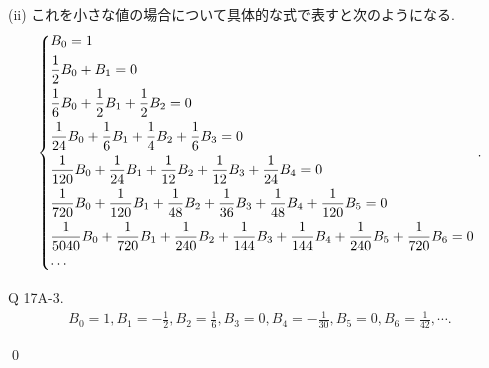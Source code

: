 \documentclass[uplatex,dvipdfmx,a4paper,11pt]{jlreq}
\makeatletter
\theoremstyle{definition}
\renewenvironment{proof}[1][\proofname]{\par
  \normalfont
  \topsep6\p@\@plus6\p@ \trivlist
  \item[\hskip\labelsep{\bfseries #1}\@addpunct{\bfseries}]\ignorespaces\quad\par
}{%
  \qed\endtrivlist\@endpefalse
}
\renewcommand\proofname{証明}
\makeatother
\begin{document}
\begin{proof}
  (ii)
  これを小さな値の場合について具体的な式で表すと次のようになる.
  \begin{align}
    \begin{dcases}
      B_0 = 1                                                                                                                                 \\
      \frac{1}{2}B_0 + B_1 = 0                                                                                                                \\
      \frac{1}{6}B_0 + \frac{1}{2}B_1 + \frac{1}{2}B_2 = 0                                                                                    \\
      \frac{1}{24}B_0 + \frac{1}{6}B_1 + \frac{1}{4}B_2 + \frac{1}{6}B_3 = 0                                                                  \\
      \frac{1}{120}B_0 + \frac{1}{24}B_1 + \frac{1}{12}B_2 + \frac{1}{12}B_3 + \frac{1}{24}B_4 = 0                                            \\
      \frac{1}{720}B_0 + \frac{1}{120}B_1 + \frac{1}{48}B_2 + \frac{1}{36}B_3 + \frac{1}{48}B_4 + \frac{1}{120}B_5 = 0                        \\
      \frac{1}{5040}B_0 + \frac{1}{720}B_1 + \frac{1}{240}B_2 + \frac{1}{144}B_3 + \frac{1}{144}B_4 + \frac{1}{240}B_5 + \frac{1}{720}B_6 = 0 \\
      \cdots
    \end{dcases}.
  \end{align}

  \begin{itembox}[l]{Q 17A-3.}
    \begin{align}
      B_0 = 1, B_1 = -\frac{1}{2}, B_2 = \frac{1}{6}, B_3 = 0, B_4 = -\frac{1}{30}, B_5 = 0, B_6 = \frac{1}{42}, \cdots.
    \end{align}
  \end{itembox}


\end{proof}
\end{document}
